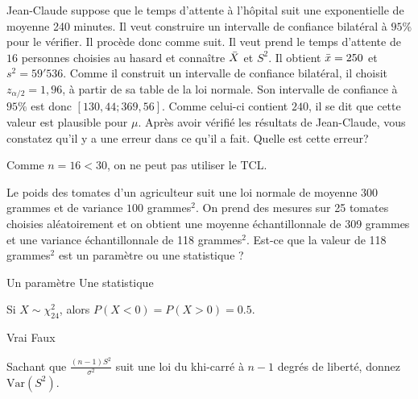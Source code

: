\begin{questions}
\begin{solution}
\end{solution}
\newpage

\question[4] 
Jean-Claude suppose que le temps d'attente à l'hôpital suit une exponentielle de moyenne 240 minutes. 
Il veut construire un intervalle de confiance bilatéral à $95\%$ pour le vérifier.
Il procède donc comme suit. 
Il veut prend le temps d'attente de $16$ personnes choisies au hasard et connaître $\Bar{X}$ et $S^2$. 
Il obtient $\Bar{x}=250$ et $s^2=59'536$.
Comme il construit un intervalle de confiance bilatéral, il choisit $z_{\alpha/2}=1,96$, à partir de sa table de la loi normale.
Son intervalle de confiance à $95\%$ est donc $[130,44;369,56]$.
Comme celui-ci contient $240$, il se dit que cette valeur est plausible pour $\mu$. 
Après avoir vérifié les résultats de Jean-Claude, vous constatez qu'il y a une erreur dans ce qu'il a fait. 
Quelle est cette erreur?

\begin{solution}
   Comme $n=16<30$, on ne peut pas utiliser le TCL.
\end{solution}
\vspace{4cm}
\question[2]
Le poids des tomates d’un agriculteur suit une loi normale de moyenne $300$ grammes
et de variance $100$ grammes$^2$. On prend des mesures sur 25 tomates choisies aléatoirement et on obtient une moyenne échantillonnale de 309 grammes et une variance échantillonnale de 118 grammes$^2$.
Est-ce que la valeur de 118 grammes$^2$ est un paramètre ou une statistique ?

\begin{oneparcheckboxes}
\choice Un paramètre
\choice Une statistique
\end{oneparcheckboxes}
\vspace{0.5cm}
\question[2]
Si $X \sim \chi^2_{24}$, alors $P(X<0)=P(X>0)=0.5$.

\begin{oneparcheckboxes}
\choice Vrai
\choice Faux
\end{oneparcheckboxes}
\vspace{0.5cm}

\question[4]
Sachant que $\displaystyle \frac{(n-1)S^2}{\sigma^2}$ suit une loi du khi-carré à $n-1$ degrés de liberté, donnez $\text{Var}(S^2)$.


\end{questions}
